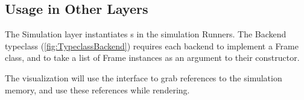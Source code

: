 \subsection{Usage in Other Layers}
The Simulation layer instantiates s in the simulation Runners.
The Backend typeclass (\cref{fig:TypeclassBackend}) requires each backend to implement a Frame class, and to take a list of Frame instances as an argument to their constructor.

The visualization will use the  interface to grab references to the simulation memory, and use these references while rendering.
